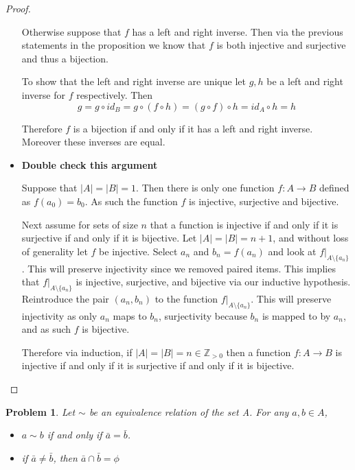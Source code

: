 \documentclass[10pt]{article}
\newcommand{\sk}{\vskip 10mm}
\newcommand{\bb}[1]{\mathbb{#1}}
\newcommand{\ra}{\rightarrow}
\theoremstyle{plain}
\newtheorem{problem}{Problem}
\theoremstyle{remark}
\begin{document}
\begin{proof}
\begin{itemize}
    Otherwise suppose that $f$ has a left and right inverse. Then via the previous
    statements in the proposition we know that $f$ is both injective and surjective and
    thus a bijection.

    To show that the left and right inverse are unique let $g,h$ be a left and right
    inverse for $f$ respectively. Then
    \[g=g\circ id_B=g\circ(f\circ h)=(g\circ f)\circ h=id_A\circ h=h\]

    Therefore $f$ is a bijection if and only if it has a left and right inverse.
    Moreover these inverses are equal.
  \item[d)] \textbf{Double check this argument}

    Suppose that $|A|=|B|=1$. Then there is only one function $f:A\ra B$
    defined as $f(a_0)=b_0$. As such the function $f$ is injective, surjective and
    bijective.

    Next assume for sets of size $n$ that a function is injective if and only if it
    is surjective if and only if it is bijective. Let $|A|=|B|=n+1$, and 
    without loss of generality let $f$ be injective. Select $a_n$ and $b_n=f(a_n)$
    and look at $f|_{A\setminus \{a_n\}}$. This will preserve injectivity since we removed
    paired items. This implies that $f|_{A\setminus\{a_n\}}$ is injective, surjective, and
    bijective via our inductive hypothesis. Reintroduce the pair $(a_n,b_n)$ to the
    function $f|_{A\setminus \{a_n\}}$. This will preserve injectivity as only $a_n$ maps
    to $b_n$, surjectivity because $b_n$ is mapped to by $a_n$, and as such $f$ is
    bijective.

    Therefore via induction, if $|A|=|B|=n\in \bb{Z}_{>0}$ then a function $f:A\ra B$ is
    injective if and only if it is surjective if and only if it is bijective.
  \end{itemize}
\end{proof}

\sk

\begin{problem}
  Let $\sim$ be an equivalence relation of the set A. For any $a,b\in A$,
  \begin{itemize}
  \item[a)] $a\sim b$ if and only if $\bar{a}=\bar{b}$.
  \item[b)] if $\bar{a}\neq \bar{b}$, then $\bar{a}\cap\bar{b}=\phi$
  \end{itemize}
\end{problem}
\end{document}
